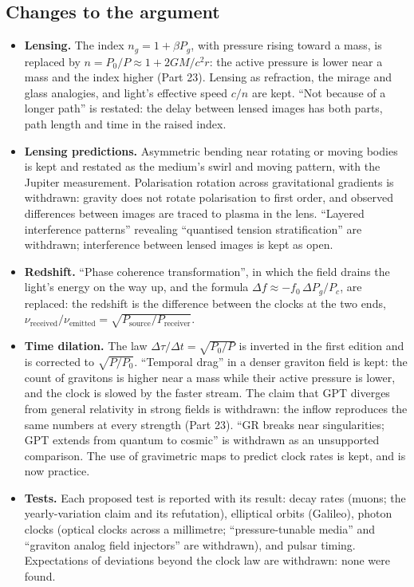 \documentclass[11pt,a4paper]{article}
\begin{document}
\subsection*{Changes to the argument}
\begin{itemize}
\item \textbf{Lensing.} The index $n_g = 1 + \beta P_g$, with pressure rising toward a mass, is replaced by $n = P_0/P \approx 1 + 2GM/c^2r$: the active pressure is lower near a mass and the index higher (Part 23). Lensing as refraction, the mirage and glass analogies, and light's effective speed $c/n$ are kept. ``Not because of a longer path'' is restated: the delay between lensed images has both parts, path length and time in the raised index.
\item \textbf{Lensing predictions.} Asymmetric bending near rotating or moving bodies is kept and restated as the medium's swirl and moving pattern, with the Jupiter measurement. Polarisation rotation across gravitational gradients is withdrawn: gravity does not rotate polarisation to first order, and observed differences between images are traced to plasma in the lens. ``Layered interference patterns'' revealing ``quantised tension stratification'' are withdrawn; interference between lensed images is kept as open.
\item \textbf{Redshift.} ``Phase coherence transformation'', in which the field drains the light's energy on the way up, and the formula $\Delta f \approx -f_0\,\Delta P_g/P_c$, are replaced: the redshift is the difference between the clocks at the two ends, $\nu_{\text{received}}/\nu_{\text{emitted}} = \sqrt{P_{\text{source}}/P_{\text{receiver}}}$.
\item \textbf{Time dilation.} The law $\Delta\tau/\Delta t = \sqrt{P_0/P}$ is inverted in the first edition and is corrected to $\sqrt{P/P_0}$. ``Temporal drag'' in a denser graviton field is kept: the count of gravitons is higher near a mass while their active pressure is lower, and the clock is slowed by the faster stream. The claim that GPT diverges from general relativity in strong fields is withdrawn: the inflow reproduces the same numbers at every strength (Part 23). ``GR breaks near singularities; GPT extends from quantum to cosmic'' is withdrawn as an unsupported comparison. The use of gravimetric maps to predict clock rates is kept, and is now practice.
\item \textbf{Tests.} Each proposed test is reported with its result: decay rates (muons; the yearly-variation claim and its refutation), elliptical orbits (Galileo), photon clocks (optical clocks across a millimetre; ``pressure-tunable media'' and ``graviton analog field injectors'' are withdrawn), and pulsar timing. Expectations of deviations beyond the clock law are withdrawn: none were found.

\end{itemize}
\end{document}
